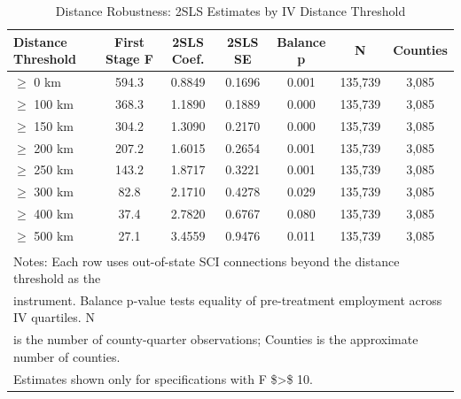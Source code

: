 \begin{table}[!h]
\centering
\caption{\label{tab:distance}Distance Robustness: 2SLS Estimates by IV Distance Threshold}
\centering
\begin{tabular}[t]{lcccccc}
\toprule
Distance Threshold & First Stage F & 2SLS Coef. & 2SLS SE & Balance p & N & Counties\\
\midrule
$\geq$ 0 km & 594.3 & 0.8849 & 0.1696 & 0.001 & 135,739 & 3,085\\
$\geq$ 100 km & 368.3 & 1.1890 & 0.1889 & 0.000 & 135,739 & 3,085\\
$\geq$ 150 km & 304.2 & 1.3090 & 0.2170 & 0.000 & 135,739 & 3,085\\
$\geq$ 200 km & 207.2 & 1.6015 & 0.2654 & 0.001 & 135,739 & 3,085\\
$\geq$ 250 km & 143.2 & 1.8717 & 0.3221 & 0.001 & 135,739 & 3,085\\
\addlinespace
$\geq$ 300 km & 82.8 & 2.1710 & 0.4278 & 0.029 & 135,739 & 3,085\\
$\geq$ 400 km & 37.4 & 2.7820 & 0.6767 & 0.080 & 135,739 & 3,085\\
$\geq$ 500 km & 27.1 & 3.4559 & 0.9476 & 0.011 & 135,739 & 3,085\\
\bottomrule
\multicolumn{7}{l}{\textsuperscript{} Notes: Each row uses out-of-state SCI connections beyond the distance threshold as the}\\
\multicolumn{7}{l}{instrument. Balance p-value tests equality of pre-treatment employment across IV quartiles. N}\\
\multicolumn{7}{l}{is the number of county-quarter observations; Counties is the approximate number of counties.}\\
\multicolumn{7}{l}{Estimates shown only for specifications with F \$>\$ 10.}\\
\end{tabular}
\end{table}
